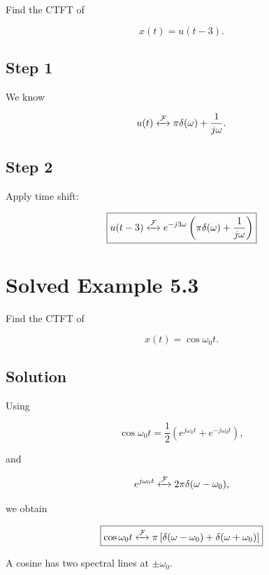 Find the CTFT of

\[
x(t)=u(t-3).
\]


\subsection{Step 1}

We know

\[
u(t)\xleftrightarrow{\mathcal{F}}
\pi\delta(\omega)+\frac{1}{j\omega}.
\]


\subsection{Step 2}

Apply time shift:

\[
\boxed{
u(t-3)
\xleftrightarrow{\mathcal{F}}
e^{-j3\omega}
\left(
\pi\delta(\omega)+\frac{1}{j\omega}
\right)
}
\]


\section{Solved Example 5.3}

Find the CTFT of

\[
x(t)=\cos\omega_0 t.
\]


\subsection{Solution}

Using

\[
\cos\omega_0 t=
\frac{1}{2}
\left(
e^{j\omega_0 t}+e^{-j\omega_0 t}
\right),
\]

and

\[
e^{j\omega_0 t}
\xleftrightarrow{\mathcal{F}}
2\pi\delta(\omega-\omega_0),
\]

we obtain

\[
\boxed{
\cos\omega_0 t
\xleftrightarrow{\mathcal{F}}
\pi
\left[
\delta(\omega-\omega_0)+\delta(\omega+\omega_0)
\right]
}
\]

A cosine has two spectral lines at \(\pm\omega_0\).


